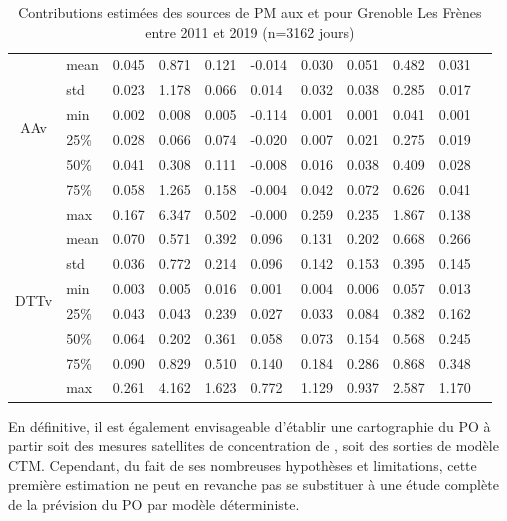 \begin{table}[ht]
\begin{tabular}{cp{1cm}p{1.3cm}p{1.3cm}p{1.3cm}p{1.3cm}p{1.3cm}p{1.3cm}p{1.3cm}p{1.3cm}p{1.3cm}}
\multirow{6}{*}{AAv}   & mean & 0.045 & 0.871 & 0.121 & -0.014 & 0.030 & 0.051 & 0.482 & 0.031\\
                       & std  & 0.023 & 1.178 & 0.066 & 0.014  & 0.032 & 0.038 & 0.285 & 0.017\\
                       & min  & 0.002 & 0.008 & 0.005 & -0.114 & 0.001 & 0.001 & 0.041 & 0.001\\
                       & 25\% & 0.028 & 0.066 & 0.074 & -0.020 & 0.007 & 0.021 & 0.275 & 0.019\\
                       & 50\% & 0.041 & 0.308 & 0.111 & -0.008 & 0.016 & 0.038 & 0.409 & 0.028\\
                       & 75\% & 0.058 & 1.265 & 0.158 & -0.004 & 0.042 & 0.072 & 0.626 & 0.041\\
                       & max  & 0.167 & 6.347 & 0.502 & -0.000 & 0.259 & 0.235 & 1.867 & 0.138\\
                          \midrule
 \multirow{6}{*}{DTTv} & mean & 0.070 & 0.571 & 0.392 & 0.096 & 0.131 & 0.202 & 0.668 & 0.266\\
                       & std  & 0.036 & 0.772 & 0.214 & 0.096 & 0.142 & 0.153 & 0.395 & 0.145\\
                       & min  & 0.003 & 0.005 & 0.016 & 0.001 & 0.004 & 0.006 & 0.057 & 0.013\\
                       & 25\% & 0.043 & 0.043 & 0.239 & 0.027 & 0.033 & 0.084 & 0.382 & 0.162\\
                       & 50\% & 0.064 & 0.202 & 0.361 & 0.058 & 0.073 & 0.154 & 0.568 & 0.245\\
                       & 75\% & 0.090 & 0.829 & 0.510 & 0.140 & 0.184 & 0.286 & 0.868 & 0.348\\
                       & max  & 0.261 & 4.162 & 1.623 & 0.772 & 1.129
                       & 0.937 & 2.587 & 1.170\\
                          \bottomrule
    \end{tabular}
    \caption{Contributions estimées des sources de PM aux \POAAv{} et \PODTTv{} pour
    Grenoble Les Frènes entre 2011 et 2019 (n=3162 jours)}
    \label{tab:OPGRE-fr_source_estimated}
\end{table}

En définitive, il est également envisageable d'établir une cartographie du PO à partir
soit des mesures satellites de concentration de \PMdix, soit des sorties de modèle CTM.
Cependant, du fait de ses nombreuses hypothèses et limitations, cette première estimation
ne peut en revanche pas se substituer à une étude complète de la prévision du PO par
modèle déterministe.

